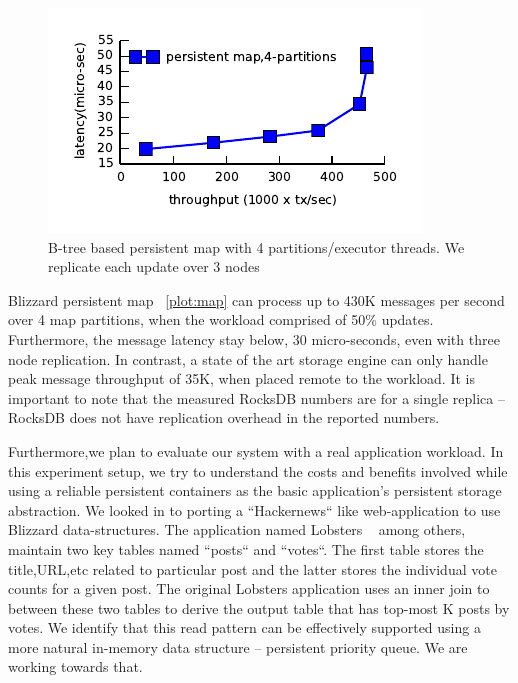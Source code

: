 \begin{figure}[tbp]   
	\centering
	\includegraphics[width=\linewidth]{plot/bliztree-partition.pdf} 
	\caption{\small B-tree based persistent map with 4 partitions/executor threads. We replicate each update over 3 nodes} 
	\label{plot:map} 
\end{figure}


Blizzard persistent map ~\autoref{plot:map} can process up to 430K messages per second over 4 map partitions, when the 
workload comprised of 50\% updates. Furthermore, the message latency stay below, 30 micro-seconds, even with three node
replication. In contrast, a state of the art storage engine can only handle peak message throughput of 35K, when 
placed remote to the workload. It is important to note that the measured RocksDB numbers are for a single replica -- RocksDB
does not have replication overhead in the reported numbers. 


Furthermore,we plan to evaluate our system with a real application workload. In this experiment setup, we try to understand the costs
and benefits involved while using a reliable persistent containers as the basic application's persistent storage abstraction.
We looked in to porting a ``Hackernews`` like web-application to use Blizzard data-structures. The application named Lobsters
~\cite{lobsters} among others, maintain two key tables named ``posts`` and ``votes``. The first table stores the 
title,URL,etc related to particular post and the latter stores the individual vote counts for a given post. The original
Lobsters application uses an inner join to between these two tables to derive the output table that has top-most K posts
by votes. We identify that this read pattern can be effectively supported using a more natural in-memory data structure --
persistent priority queue. We are working towards that.


